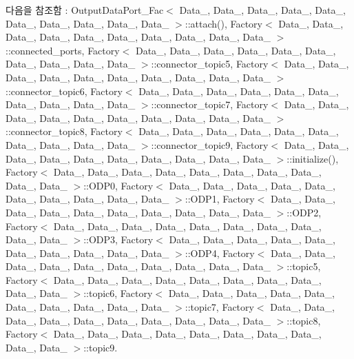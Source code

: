 다음을 참조함 \+:  Output\+Data\+Port\+\_\+\+Fac$<$ Data\+\_, Data\+\_, Data\+\_, Data\+\_, Data\+\_, Data\+\_, Data\+\_, Data\+\_, Data\+\_, Data\+\_ $>$\+::attach(), Factory$<$ Data\+\_, Data\+\_, Data\+\_, Data\+\_, Data\+\_, Data\+\_, Data\+\_, Data\+\_, Data\+\_, Data\+\_ $>$\+::connected\+\_\+ports, Factory$<$ Data\+\_, Data\+\_, Data\+\_, Data\+\_, Data\+\_, Data\+\_, Data\+\_, Data\+\_, Data\+\_, Data\+\_ $>$\+::connector\+\_\+topic5, Factory$<$ Data\+\_, Data\+\_, Data\+\_, Data\+\_, Data\+\_, Data\+\_, Data\+\_, Data\+\_, Data\+\_, Data\+\_ $>$\+::connector\+\_\+topic6, Factory$<$ Data\+\_, Data\+\_, Data\+\_, Data\+\_, Data\+\_, Data\+\_, Data\+\_, Data\+\_, Data\+\_, Data\+\_ $>$\+::connector\+\_\+topic7, Factory$<$ Data\+\_, Data\+\_, Data\+\_, Data\+\_, Data\+\_, Data\+\_, Data\+\_, Data\+\_, Data\+\_, Data\+\_ $>$\+::connector\+\_\+topic8, Factory$<$ Data\+\_, Data\+\_, Data\+\_, Data\+\_, Data\+\_, Data\+\_, Data\+\_, Data\+\_, Data\+\_, Data\+\_ $>$\+::connector\+\_\+topic9, Factory$<$ Data\+\_, Data\+\_, Data\+\_, Data\+\_, Data\+\_, Data\+\_, Data\+\_, Data\+\_, Data\+\_, Data\+\_ $>$\+::initialize(), Factory$<$ Data\+\_, Data\+\_, Data\+\_, Data\+\_, Data\+\_, Data\+\_, Data\+\_, Data\+\_, Data\+\_, Data\+\_ $>$\+::\+O\+D\+P0, Factory$<$ Data\+\_, Data\+\_, Data\+\_, Data\+\_, Data\+\_, Data\+\_, Data\+\_, Data\+\_, Data\+\_, Data\+\_ $>$\+::\+O\+D\+P1, Factory$<$ Data\+\_, Data\+\_, Data\+\_, Data\+\_, Data\+\_, Data\+\_, Data\+\_, Data\+\_, Data\+\_, Data\+\_ $>$\+::\+O\+D\+P2, Factory$<$ Data\+\_, Data\+\_, Data\+\_, Data\+\_, Data\+\_, Data\+\_, Data\+\_, Data\+\_, Data\+\_, Data\+\_ $>$\+::\+O\+D\+P3, Factory$<$ Data\+\_, Data\+\_, Data\+\_, Data\+\_, Data\+\_, Data\+\_, Data\+\_, Data\+\_, Data\+\_, Data\+\_ $>$\+::\+O\+D\+P4, Factory$<$ Data\+\_, Data\+\_, Data\+\_, Data\+\_, Data\+\_, Data\+\_, Data\+\_, Data\+\_, Data\+\_, Data\+\_ $>$\+::topic5, Factory$<$ Data\+\_, Data\+\_, Data\+\_, Data\+\_, Data\+\_, Data\+\_, Data\+\_, Data\+\_, Data\+\_, Data\+\_ $>$\+::topic6, Factory$<$ Data\+\_, Data\+\_, Data\+\_, Data\+\_, Data\+\_, Data\+\_, Data\+\_, Data\+\_, Data\+\_, Data\+\_ $>$\+::topic7, Factory$<$ Data\+\_, Data\+\_, Data\+\_, Data\+\_, Data\+\_, Data\+\_, Data\+\_, Data\+\_, Data\+\_, Data\+\_ $>$\+::topic8, Factory$<$ Data\+\_, Data\+\_, Data\+\_, Data\+\_, Data\+\_, Data\+\_, Data\+\_, Data\+\_, Data\+\_, Data\+\_ $>$\+::topic9.



